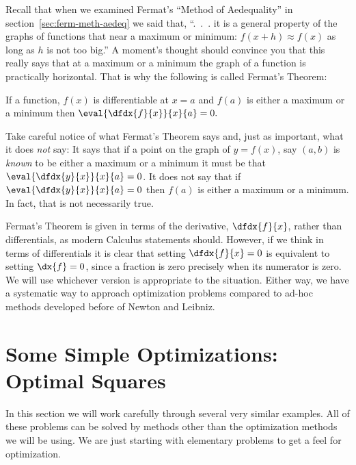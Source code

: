Recall that when we examined  Fermat's  ``Method of Aedequality'' in
section~\ref{sec:ferm-meth-aedeq} we said that, ``.\ .\ . it is a general
property of the graphs of functions that near a maximum or minimum:
$f(x+h)\approx f(x)$ as long as $h$ is not too big.'' A moment's
thought should convince you that this really says that at a maximum or
a minimum the graph of a function is practically horizontal. That is
why the following is called Fermat's Theorem:

\begin{mytheorem}
  \label{thm:FermatsTheorem}
  If a function, $f(x)$ is differentiable at $x=a$ and
  $f(a)$ is either a maximum or a minimum then
  $\eval{\dfdx{f}{x}}{x}{a}=0.$
\end{mytheorem}

Take careful notice of what Fermat's Theorem says and, just as
important, what it does \emph{not} say: It says that if a point on
the graph of $y=f(x)$, say $(a, b)$ is \emph{known} to be either a maximum or a
minimum it must be that $\eval{\dfdx{y}{x}}{x}{a}=0$. It does
\alert{not} say that if $\eval{\dfdx{y}{x}}{x}{a}=0$ then $f(a)$ is
either a maximum or a minimum. In fact, that is not necessarily true.

Fermat's Theorem is given in terms of the derivative, $\dfdx{f}{x}$,
rather than differentials, as modern Calculus statements should.
However, if we think in terms of differentials it is clear that
setting $\dfdx{f}{x}=0$ is equivalent to setting $\dx{f}=0$, since a
fraction is zero precisely when its numerator is zero. We will use
whichever version is appropriate to the situation.  Either way, we
have a systematic way to approach optimization problems compared to
ad-hoc methods developed before of Newton and Leibniz.

\section{Some Simple Optimizations: Optimal Squares}\label{sec:five-simil-probl}
\label{example:LineDist}

In this section we will work carefully through several very similar
examples. All of these problems can be solved by methods other than
the optimization methods we will be using. We are just starting with
elementary problems to get a feel for optimization.



